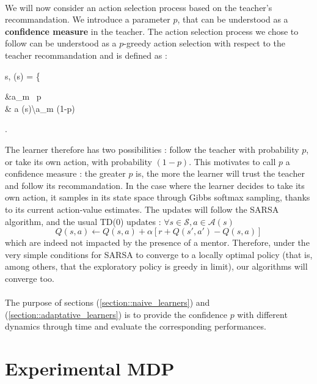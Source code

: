 \documentclass[a4paper]{report}
\begin{document}
{{			\paragraph{} We will now consider an action selection process based on the teacher's recommandation. We introduce a parameter $p$, that can be understood as a \textbf{confidence measure} in the teacher. The action selection process we chose to follow can be understood as a $p$-greedy action selection with respect to the teacher recommandation and is defined as : 
			{
				\forall s\in{}, \quad \pi(s) = \left\{
				\begin{aligned}
					&a_m \, p \\
					& a \in {}(s)\backslash a_m  (1-p)
				\end{aligned}\right.
				\label{eq::compliant_exploration}
			}
			The learner therefore has two possibilities : follow the teacher with probability $p$, or take its own action, with probability $(1-p)$. This motivates to call $p$ a confidence measure : the greater $p$ is, the more the learner will trust the teacher and follow its recommandation. In the case where the learner decides to take its own action, it samples in its state space through Gibbs softmax sampling, thanks to its current action-value estimates. \newline
			The updates will follow the SARSA algorithm, and the usual TD(0) updates : $\forall s\in\mathcal{S}, a\in\mathcal{A}(s)$
			\begin{equation}
				Q(s,a) \leftarrow Q(s,a) + \alpha \left[ r + Q(s',a') - Q(s,a) \right]
			\end{equation}
			which are indeed not impacted by the presence of a mentor. Therefore, under the very simple conditions for SARSA to converge to a locally optimal policy (that is, among others, that the exploratory policy is greedy in limit), our algorithms will converge too. 
			
			\paragraph{} The purpose of sections (\ref{section::naive_learners}) and (\ref{section::adaptative_learners}) is to provide the confidence $p$ with different dynamics through time and evaluate the corresponding performances. 
			
		}
		\section{Experimental MDP}
		{
}}
\end{document}
